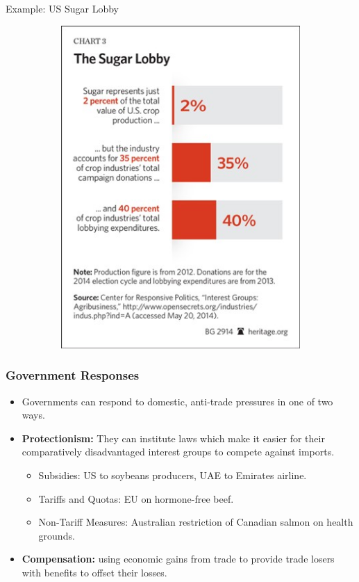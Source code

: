\documentclass[handout]{beamer}
\begin{document}
\begin{frame}{\LARGE Example: US Sugar Lobby}
\begin{figure}
\begin{subfigure}{0.49\textwidth}
			\includegraphics[width = \textwidth, height=.9\textheight]{sugar2.jpg}
		\end{subfigure}
	\end{figure}
\end{frame}

\begin{frame} 
	\frametitle{\LARGE Government Responses}
	\begin{itemize}
			\item Governments can respond to domestic, anti-trade pressures in one of two ways. \pause 
			\item \textbf{Protectionism:} \pause They can institute laws which make it easier for their comparatively disadvantaged interest groups to compete against imports. \pause 
			\begin{itemize}
				\item Subsidies: US to soybeans producers, UAE to Emirates airline. \pause
				\item Tariffs and Quotas: EU on hormone-free beef. \pause 
				\item Non-Tariff Measures: Australian restriction of Canadian salmon on health grounds. \pause 
			\end{itemize}
			\item \textbf{Compensation:} \pause using economic gains from trade to provide trade losers with benefits to offset their losses.
	\end{itemize}
\end{frame}
\end{document}
